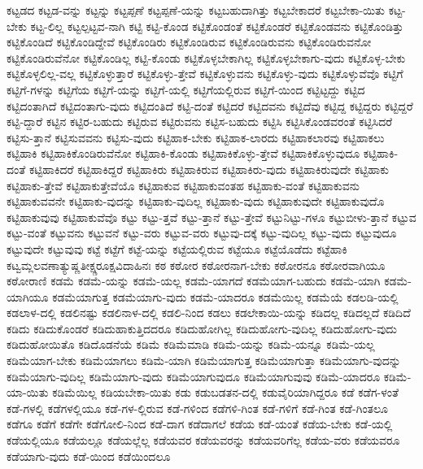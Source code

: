 {ಕಟ್ಟಡದ
ಕಟ್ಟಡ-ವನ್ನು
ಕಟ್ಟನ್ನು
ಕಟ್ಟಪ್ಪಣೆ
ಕಟ್ಟಪ್ಪಣೆ-ಯನ್ನು
ಕಟ್ಟಬಹುದಾಗಿತ್ತು
ಕಟ್ಟಬೇಕಾದರೆ
ಕಟ್ಟಬೇಕಾ-ಯಿತು
ಕಟ್ಟ-ಬೇಕು
ಕಟ್ಟ-ಲಿಲ್ಲ
ಕಟ್ಟಲ್ಪಟ್ಟವ-ನಾಗಿ
ಕಟ್ಟಿ
ಕಟ್ಟಿ-ಕೊಂಡ
ಕಟ್ಟಿಕೊಂಡಂತೆ
ಕಟ್ಟಿಕೊಂಡರೆ
ಕಟ್ಟಿಕೊಂಡವನು
ಕಟ್ಟಿಕೊಂಡಿತ್ತು
ಕಟ್ಟಿಕೊಂಡಿದೆ
ಕಟ್ಟಿಕೊಂಡಿದ್ದೇವೆ
ಕಟ್ಟಿಕೊಂಡಿರು
ಕಟ್ಟಿಕೊಂಡಿರುವ
ಕಟ್ಟಿಕೊಂಡಿರುವನು
ಕಟ್ಟಿಕೊಂಡಿರುವನೋ
ಕಟ್ಟಿಕೊಂಡಿರುವೆನೋ
ಕಟ್ಟಿಕೊಂಡಿಲ್ಲ
ಕಟ್ಟಿ-ಕೊಂಡು
ಕಟ್ಟಿಕೊಳ್ಳಬೇಕಾಗಿಲ್ಲ
ಕಟ್ಟಿಕೊಳ್ಳಬೇಕಾಗು-ವುದು
ಕಟ್ಟಿಕೊಳ್ಳ-ಬೇಕು
ಕಟ್ಟಿಕೊಳ್ಳಲಿಲ್ಲ-ವಲ್ಲ
ಕಟ್ಟಿಕೊಳ್ಳುತ್ತಾರೆ
ಕಟ್ಟಿಕೊಳ್ಳು-ತ್ತೇವೆ
ಕಟ್ಟಿಕೊಳ್ಳುವನು
ಕಟ್ಟಿಕೊಳ್ಳು-ವುದು
ಕಟ್ಟಿಕೊಳ್ಳುವೆವೊ
ಕಟ್ಟಿಗೆ
ಕಟ್ಟಿಗೆ-ಗಳನ್ನು
ಕಟ್ಟಿಗೆಯ
ಕಟ್ಟಿಗೆ-ಯನ್ನು
ಕಟ್ಟಿಗೆ-ಯಲ್ಲಿ
ಕಟ್ಟಿಗೆಯಲ್ಲಿರುವ
ಕಟ್ಟಿಗೆ-ಯಿಂದ
ಕಟ್ಟಿಟ್ಟದ್ದು
ಕಟ್ಟಿದ
ಕಟ್ಟಿದಂತಾಗಿದೆ
ಕಟ್ಟಿದಂತಾಗು-ವುದು
ಕಟ್ಟಿದಂತಿದೆ
ಕಟ್ಟಿ-ದಂತೆ
ಕಟ್ಟಿದರೆ
ಕಟ್ಟಿದವನು
ಕಟ್ಟಿದೆವು
ಕಟ್ಟಿದ್ದ
ಕಟ್ಟಿದ್ದರು
ಕಟ್ಟಿದ್ದರೆ
ಕಟ್ಟಿ-ದ್ದಾರೆ
ಕಟ್ಟಿನ
ಕಟ್ಟಿರ-ಬಹುದು
ಕಟ್ಟಿರುವ
ಕಟ್ಟಿರುವನು
ಕಟ್ಟಿಸ-ಬಹುದು
ಕಟ್ಟಿಸಿ
ಕಟ್ಟಿಸಿಕೊಂಡವರಂತೆ
ಕಟ್ಟಿಸಿದರೆ
ಕಟ್ಟಿಸು-ತ್ತಾನೆ
ಕಟ್ಟಿಸುವವನು
ಕಟ್ಟಿಸು-ವುದು
ಕಟ್ಟಿಹಾಕ-ಬೇಕು
ಕಟ್ಟಿಹಾಕ-ಲಾರದು
ಕಟ್ಟಿಹಾಕಲಾರವು
ಕಟ್ಟಿಹಾಕಲು
ಕಟ್ಟಿಹಾಕಿ
ಕಟ್ಟಿಹಾಕಿಕೊಂಡಿರುವೆನೋ
ಕಟ್ಟಿಹಾಕಿ-ಕೊಂಡು
ಕಟ್ಟಿಹಾಕಿಕೊಳ್ಳು-ತ್ತೇವೆ
ಕಟ್ಟಿಹಾಕಿಕೊಳ್ಳುವುದೂ
ಕಟ್ಟಿಹಾಕಿ-ದಂತೆ
ಕಟ್ಟಿಹಾಕಿದರೆ
ಕಟ್ಟಿಹಾಕಿದ್ದರೆ
ಕಟ್ಟಿಹಾಕಿರು
ಕಟ್ಟಿಹಾಕಿರುವ
ಕಟ್ಟಿಹಾಕಿರು-ವುದು
ಕಟ್ಟಿಹಾಕಿರುವುದೇ
ಕಟ್ಟಿಹಾಕು
ಕಟ್ಟಿಹಾಕು-ತ್ತೇವೆ
ಕಟ್ಟಿಹಾಕುತ್ತೇವೆಯೊ
ಕಟ್ಟಿಹಾಕುವ
ಕಟ್ಟಿಹಾಕುವಂತಹ
ಕಟ್ಟಿಹಾಕು-ವಂತೆ
ಕಟ್ಟಿಹಾಕುವನು
ಕಟ್ಟಿಹಾಕುವವನೇ
ಕಟ್ಟಿಹಾಕು-ವುದನ್ನು
ಕಟ್ಟಿಹಾಕು-ವುದಿಲ್ಲ
ಕಟ್ಟಿಹಾಕು-ವುದು
ಕಟ್ಟಿಹಾಕುವುದೇ
ಕಟ್ಟಿಹಾಕುವುದೊ
ಕಟ್ಟಿಹಾಕುವುವು
ಕಟ್ಟಿಹಾಕುವೆವೊ
ಕಟ್ಟು
ಕಟ್ಟು-ತ್ತವೆ
ಕಟ್ಟು-ತ್ತಾನೆ
ಕಟ್ಟು-ತ್ತೇವೆ
ಕಟ್ಟುನಿಟ್ಟು-ಗಳೂ
ಕಟ್ಟುಬೀಳು-ತ್ತಾನೆ
ಕಟ್ಟುವ
ಕಟ್ಟು-ವಂತೆ
ಕಟ್ಟುವನು
ಕಟ್ಟುವನೆ
ಕಟ್ಟು-ವರು
ಕಟ್ಟುವ-ವರು
ಕಟ್ಟುವು-ದಕ್ಕೆ
ಕಟ್ಟು-ವುದಿಲ್ಲ
ಕಟ್ಟು-ವುದು
ಕಟ್ಟುವುದೂ
ಕಟ್ಟುವುದೇ
ಕಟ್ಟುವುವು
ಕಟ್ಟೆ
ಕಟ್ಟೆಗೆ
ಕಟ್ಟೆ-ಯನ್ನು
ಕಟ್ಟೆಯಲ್ಲಿರುವ
ಕಟ್ಟೆಯೂ
ಕಟ್ಟೆಯೊಡೆದು
ಕಟ್ಟೆಹಾಕಿ
ಕಟ್ವಮ್ಲಲವಣಾತ್ಯುಷ್ಣತೀಕ್ಷ್ಣರೂಕ್ಷವಿದಾಹಿನಃ
ಕಠ
ಕಠೋರ
ಕಠೋರನಾಗ-ಬೇಕು
ಕಠೋರನೂ
ಕಠೋರವಾಗಿಯೂ
ಕಠೋರಾಣಿ
ಕಡಮೆ
ಕಡಮೆ-ಯನ್ನು
ಕಡಮೆ-ಯಲ್ಲ
ಕಡಮೆ-ಯಾಗದೆ
ಕಡಮೆಯಾಗ-ಬಹುದು
ಕಡಮೆ-ಯಾಗಿ
ಕಡಮೆ-ಯಾಗಿಯೂ
ಕಡಮೆಯಾಗುತ್ತ
ಕಡಮೆಯಾಗು-ವುದು
ಕಡಮೆ-ಯಾದರೂ
ಕಡಮೆಯಿಲ್ಲ
ಕಡಮೆಯೆ
ಕಡಲಡಿ-ಯಲ್ಲಿ
ಕಡಲಾಳ-ದಲ್ಲಿ
ಕಡಲಿನಷ್ಟು
ಕಡಲಿನಾಳ-ದಲ್ಲಿ
ಕಡಲಿ-ನಿಂದ
ಕಡಲು
ಕಡಲೇಕಾಯಿ-ಯನ್ನು
ಕಡಿದಲ್ಲ
ಕಡಿದಲ್ಲದೆ
ಕಡಿದಿದೆ
ಕಡಿದು
ಕಡಿದುಕೊಂಡರೆ
ಕಡಿದುಹಾಕುತ್ತಿದದರೂ
ಕಡಿದುಹೋಗಿಲ್ಲ
ಕಡಿದುಹೋಗು-ವುದಿಲ್ಲ
ಕಡಿದುಹೋಗು-ವುದು
ಕಡಿದುಹೋಯಿತೊ
ಕಡಿದೊಡನೆಯೆ
ಕಡಿಮೆ
ಕಡಿಮೆಮಾಡಿ
ಕಡಿಮೆ-ಯನ್ನು
ಕಡಿಮೆ-ಯನ್ನೂ
ಕಡಿಮೆ-ಯಲ್ಲ
ಕಡಿಮೆಯಾಗ-ಬೇಕು
ಕಡಿಮೆಯಾಗಲು
ಕಡಿಮೆ-ಯಾಗಿ
ಕಡಿಮೆಯಾಗುತ್ತ
ಕಡಿಮೆಯಾಗುತ್ತಾ
ಕಡಿಮೆಯಾಗು-ವುದನ್ನು
ಕಡಿಮೆಯಾಗು-ವುದಿಲ್ಲ
ಕಡಿಮೆಯಾಗು-ವುದು
ಕಡಿಮೆಯಾಗುವುದೂ
ಕಡಿಮೆಯಾಗುವುವು
ಕಡಿಮೆ-ಯಾದರೂ
ಕಡಿಮೆ-ಯಾ-ಯಿತು
ಕಡಿಮೆಯಿಲ್ಲ
ಕಡಿಯಬೇಕಾ-ಯಿತು
ಕಡು
ಕಡುಬಡತನ-ದಲ್ಲಿ
ಕಡುವೈರಿಯಾಗಿದ್ದರೂ
ಕಡೆ
ಕಡೆಗ-ಳಂತೆ
ಕಡೆ-ಗಳಲ್ಲಿ
ಕಡೆಗಳಲ್ಲಿಯೂ
ಕಡೆ-ಗಳ-ಲ್ಲಿರುವ
ಕಡೆ-ಗಳಿಂದ
ಕಡೆಗಳಿ-ಗಿಂತ
ಕಡೆ-ಗಳಿಗೆ
ಕಡೆ-ಗಿಂತ
ಕಡೆ-ಗಿಂತಲೂ
ಕಡೆಗೂ
ಕಡೆಗೆ
ಕಡೆಗೇ
ಕಡೆಗೋಲಿ-ನಿಂದ
ಕಡೆ-ದಾಗ
ಕಡೆದಾಗಲೆ
ಕಡೆಯ
ಕಡೆ-ಯಂತೆ
ಕಡೆಯ-ಬೇಕು
ಕಡೆ-ಯಲ್ಲಿ
ಕಡೆಯಲ್ಲಿಯೂ
ಕಡೆಯಲ್ಲೂ
ಕಡೆಯಲ್ಲೆಲ್ಲ
ಕಡೆಯವರ
ಕಡೆಯವರನ್ನು
ಕಡೆಯವರಿಗೆಲ್ಲ
ಕಡೆಯ-ವರು
ಕಡೆಯವರೂ
ಕಡೆಯಾಗು-ವುದು
ಕಡೆ-ಯಿಂದ
ಕಡೆಯಿಂದಲೂ
}
